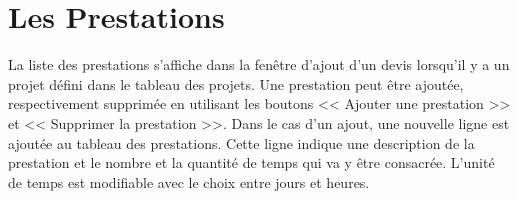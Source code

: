\section{Les Prestations}
La liste des prestations s'affiche dans la fenêtre d'ajout d'un devis lorsqu'il y a un projet défini dans le tableau des projets. Une prestation peut être ajoutée, respectivement supprimée en utilisant les boutons << Ajouter une prestation >> et << Supprimer la prestation >>. Dans le cas d'un ajout, une nouvelle ligne est ajoutée au tableau des prestations. Cette ligne indique une description de la prestation et le nombre et la quantité de temps qui va y être consacrée. L'unité de temps est modifiable avec le choix entre jours et heures.